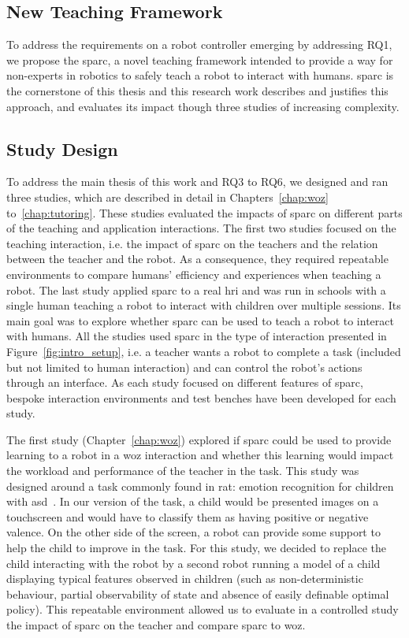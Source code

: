 \subsection{New Teaching Framework}

To address the requirements on a robot controller emerging by addressing RQ1, we propose the \gls{sparc}, a novel teaching framework intended to provide a way for non-experts in robotics to safely teach a robot to interact with humans. \gls{sparc} is the cornerstone of this thesis and this research work describes and justifies this approach, and evaluates its impact though three studies of increasing complexity.

\subsection{Study Design} 

To address the main thesis of this work and RQ3 to RQ6, we designed and ran three studies, which are described in detail in Chapters~\ref{chap:woz} to~\ref{chap:tutoring}. These studies evaluated the impacts of \gls{sparc} on different parts of the teaching and application interactions. The first two studies focused on the teaching interaction, i.e. the impact of \gls{sparc} on the teachers and the relation between the teacher and the robot. As a consequence, they required repeatable environments to compare humans' efficiency and experiences when teaching a robot. The last study applied \gls{sparc} to a real \gls{hri} and was run in schools with a single human teaching a robot to interact with children over multiple sessions. Its main goal was to explore whether \gls{sparc} can be used to teach a robot to interact with humans. All the studies used \gls{sparc} in the type of interaction presented in Figure~\ref{fig:intro_setup}, i.e. a teacher wants a robot to complete a task (included but not limited to human interaction) and can control the robot's actions through an interface. As each study focused on different features of \gls{sparc}, bespoke interaction environments and test benches have been developed for each study.

The first study (Chapter~\ref{chap:woz}) explored if \gls{sparc} could be used to provide learning to a robot in a \gls{woz} interaction and whether this learning would impact the workload and performance of the teacher in the task. This study was designed around a task commonly found in \gls{rat}: emotion recognition for children with \gls{asd}~\citep{dautenhahn2004towards}. In our version of the task, a child would be presented images on a touchscreen and would have to classify them as having positive or negative valence. On the other side of the screen, a robot can provide some support to help the child to improve in the task. For this study, we decided to replace the child interacting with the robot by a second robot running a model of a child displaying typical features observed in children (such as non-deterministic behaviour, partial observability of state and absence of easily definable optimal policy). This repeatable environment allowed us to evaluate in a controlled study the impact of \gls{sparc} on the teacher and compare \gls{sparc} to \gls{woz}.

